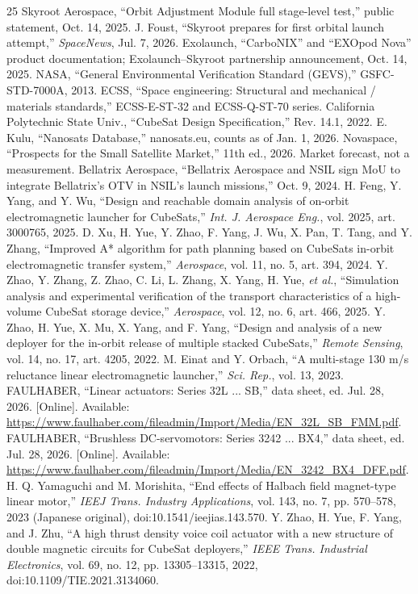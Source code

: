 \documentclass[conference]{IEEEtran}
\begin{document}
\begin{thebibliography}{25}
 Skyroot Aerospace, ``Orbit Adjustment Module full stage-level test,'' public statement, Oct. 14, 2025.
 J. Foust, ``Skyroot prepares for first orbital launch attempt,'' \emph{SpaceNews}, Jul. 7, 2026.
 Exolaunch, ``CarboNIX'' and ``EXOpod Nova'' product documentation; Exolaunch--Skyroot partnership announcement, Oct. 14, 2025.
 NASA, ``General Environmental Verification Standard (GEVS),'' GSFC-STD-7000A, 2013.
 ECSS, ``Space engineering: Structural and mechanical / materials standards,'' ECSS-E-ST-32 and ECSS-Q-ST-70 series.
 California Polytechnic State Univ., ``CubeSat Design Specification,'' Rev. 14.1, 2022.
 E. Kulu, ``Nanosats Database,'' nanosats.eu, counts as of Jan. 1, 2026.
 Novaspace, ``Prospects for the Small Satellite Market,'' 11th ed., 2026. Market forecast, not a measurement.
 Bellatrix Aerospace, ``Bellatrix Aerospace and NSIL sign MoU to integrate Bellatrix's OTV in NSIL's launch missions,'' Oct. 9, 2024.
 H. Feng, Y. Yang, and Y. Wu, ``Design and reachable domain analysis of on-orbit electromagnetic launcher for CubeSats,'' \emph{Int. J. Aerospace Eng.}, vol. 2025, art. 3000765, 2025.
 D. Xu, H. Yue, Y. Zhao, F. Yang, J. Wu, X. Pan, T. Tang, and Y. Zhang, ``Improved A* algorithm for path planning based on CubeSats in-orbit electromagnetic transfer system,'' \emph{Aerospace}, vol. 11, no. 5, art. 394, 2024.
 Y. Zhao, Y. Zhang, Z. Zhao, C. Li, L. Zhang, X. Yang, H. Yue, \emph{et al.}, ``Simulation analysis and experimental verification of the transport characteristics of a high-volume CubeSat storage device,'' \emph{Aerospace}, vol. 12, no. 6, art. 466, 2025.
 Y. Zhao, H. Yue, X. Mu, X. Yang, and F. Yang, ``Design and analysis of a new deployer for the in-orbit release of multiple stacked CubeSats,'' \emph{Remote Sensing}, vol. 14, no. 17, art. 4205, 2022.
 M. Einat and Y. Orbach, ``A multi-stage 130 m/s reluctance linear electromagnetic launcher,'' \emph{Sci. Rep.}, vol. 13, 2023.
 FAULHABER, ``Linear actuators: Series 32L ... SB,'' data sheet, ed. Jul. 28, 2026. [Online]. Available: \url{https://www.faulhaber.com/fileadmin/Import/Media/EN_32L_SB_FMM.pdf}.
 FAULHABER, ``Brushless DC-servomotors: Series 3242 ... BX4,'' data sheet, ed. Jul. 28, 2026. [Online]. Available: \url{https://www.faulhaber.com/fileadmin/Import/Media/EN_3242_BX4_DFF.pdf}.
 H. Q. Yamaguchi and M. Morishita, ``End effects of Halbach field magnet-type linear motor,'' \emph{IEEJ Trans. Industry Applications}, vol. 143, no. 7, pp. 570--578, 2023 (Japanese original), doi:10.1541/ieejias.143.570.
 Y. Zhao, H. Yue, F. Yang, and J. Zhu, ``A high thrust density voice coil actuator with a new structure of double magnetic circuits for CubeSat deployers,'' \emph{IEEE Trans. Industrial Electronics}, vol. 69, no. 12, pp. 13305--13315, 2022, doi:10.1109/TIE.2021.3134060.
\end{thebibliography}
\end{document}
